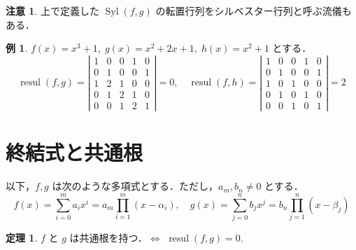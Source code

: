 \documentclass[12pt, uplatex, dvipdfmx]{jsarticle}
\theoremstyle{definition}
\newtheorem{theorem}{定理}
\newtheorem{example}{例}
\newtheorem*{remark}{注意}
\DeclareMathOperator{\Syl}{Syl}
\DeclareMathOperator{\resul}{resul}
\begin{document}
\begin{remark}
  上で定義した $\Syl(f,g)$ の転置行列をシルベスター行列と呼ぶ流儀もある．
\end{remark}

\begin{example}\label{exmp:fgh}
  $f(x) = x^3+1, \; g(x)=x^2+2x+1, \; h(x) = x^2+1$ とする．
  \[
    \resul(f,g) = \left| 
      \begin{array}{ccccc}
        1 & 0 & 0 & 1 & 0\\
        0 & 1 & 0 & 0 & 1\\
        1 & 2 & 1 & 0 & 0\\
        0 & 1 & 2 & 1 & 0\\
        0 & 0 & 1 & 2 & 1
      \end{array}
    \right|=0, \quad \resul(f,h) = \left|
      \begin{array}{ccccc}
        1 & 0 & 0 & 1 & 0\\
        0 & 1 & 0 & 0 & 1\\
        1 & 0 & 1 & 0 & 0\\
        0 & 1 & 0 & 1 & 0\\
        0 & 0 & 1 & 0 & 1
      \end{array}
    \right|=2
  \]
\end{example}

\section{終結式と共通根}

以下，$f,g$ は次のような多項式とする．ただし，$a_m, b_n \neq 0$ とする．
\[
  f(x)=\sum_{i=0}^{m} a_i x^i = a_m\prod_{i=1}^{m}(x-\alpha_i), \quad
  g(x)=\sum_{j=0}^{n} b_j x^j=b_n\prod_{j=1}^{n}(x-\beta_j)
\]

\begin{theorem}\label{thm:common-solution}
$f$ と $g$ は共通根を持つ．$\Longleftrightarrow$ \;$\resul(f,g)=0$.
\end{theorem}
\end{document}
